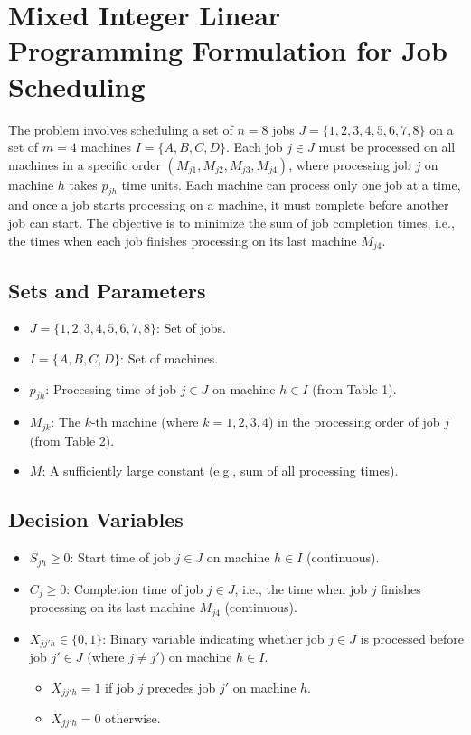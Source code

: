 \documentclass{article}
\begin{document}
\section*{Mixed Integer Linear Programming Formulation for Job Scheduling}

The problem involves scheduling a set of $n=8$ jobs $J = \{1, 2, 3, 4, 5, 6, 7, 8\}$ on a set of $m=4$ machines $I = \{A, B, C, D\}$. Each job $j \in J$ must be processed on all machines in a specific order $(M_{j1}, M_{j2}, M_{j3}, M_{j4})$, where processing job $j$ on machine $h$ takes $p_{jh}$ time units. Each machine can process only one job at a time, and once a job starts processing on a machine, it must complete before another job can start. The objective is to minimize the sum of job completion times, i.e., the times when each job finishes processing on its last machine $M_{j4}$.

\subsection*{Sets and Parameters}
\begin{itemize}
    \item $J = \{1, 2, 3, 4, 5, 6, 7, 8\}$: Set of jobs.
    \item $I = \{A, B, C, D\}$: Set of machines.
    \item $p_{jh}$: Processing time of job $j \in J$ on machine $h \in I$ (from Table 1).
    \item $M_{jk}$: The $k$-th machine (where $k = 1, 2, 3, 4$) in the processing order of job $j$ (from Table 2).
    \item $M$: A sufficiently large constant (e.g., sum of all processing times).
\end{itemize}

\subsection*{Decision Variables}
\begin{itemize}
    \item $S_{jh} \geq 0$: Start time of job $j \in J$ on machine $h \in I$ (continuous).
    \item $C_j \geq 0$: Completion time of job $j \in J$, i.e., the time when job $j$ finishes processing on its last machine $M_{j4}$ (continuous).
    \item $X_{jj'h} \in \{0, 1\}$: Binary variable indicating whether job $j \in J$ is processed before job $j' \in J$ (where $j \neq j'$) on machine $h \in I$.
        \begin{itemize}
            \item $X_{jj'h} = 1$ if job $j$ precedes job $j'$ on machine $h$.
            \item $X_{jj'h} = 0$ otherwise.
        \end{itemize}
\end{itemize}
\end{document}
